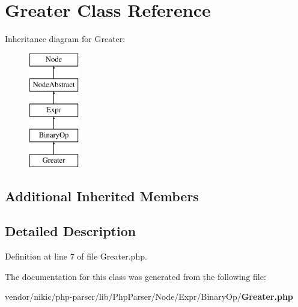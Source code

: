 \section{Greater Class Reference}
\label{class_php_parser_1_1_node_1_1_expr_1_1_binary_op_1_1_greater}
Inheritance diagram for Greater\+:\begin{figure}[H]
\begin{center}
\leavevmode
\includegraphics[height=5.000000cm]{class_php_parser_1_1_node_1_1_expr_1_1_binary_op_1_1_greater}
\end{center}
\end{figure}
\subsection*{Additional Inherited Members}


\subsection{Detailed Description}


Definition at line 7 of file Greater.\+php.



The documentation for this class was generated from the following file\+:\begin{DoxyCompactItemize}
\item 
vendor/nikic/php-\/parser/lib/\+Php\+Parser/\+Node/\+Expr/\+Binary\+Op/{\bf Greater.\+php}\end{DoxyCompactItemize}
